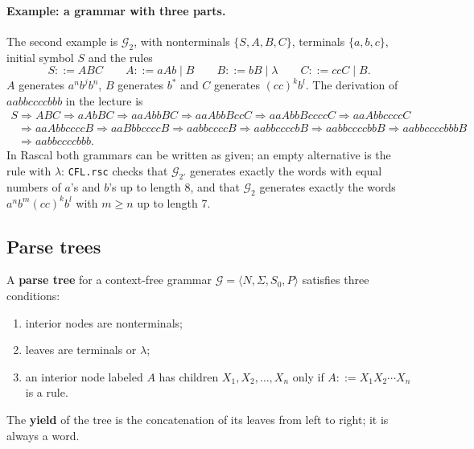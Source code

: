 \paragraph{Example: a grammar with three parts.} The second example is
$\mathcal{G}_2$, with nonterminals $\{S, A, B, C\}$, terminals $\{a, b, c\}$,
initial symbol $S$ and the rules
\[
S ::= ABC \qquad A ::= aAb \mid B \qquad B ::= bB \mid \lambda \qquad C ::= ccC \mid B.
\]
$A$ generates $a^n b^j b^n$, $B$ generates $b^*$ and $C$ generates $(cc)^k b^l$.
The derivation of $aabbccccbbb$ in the lecture is
\[
\begin{array}{l}
S \Rightarrow ABC \Rightarrow aAbBC \Rightarrow aaAbbBC \Rightarrow aaAbbBccC
  \Rightarrow aaAbbBccccC \Rightarrow aaAbbccccC \\
\phantom{S} \Rightarrow aaAbbccccB \Rightarrow aaBbbccccB \Rightarrow aabbccccB
  \Rightarrow aabbccccbB \Rightarrow aabbccccbbB \Rightarrow aabbccccbbbB \\
\phantom{S} \Rightarrow aabbccccbbb.
\end{array}
\]
In Rascal both grammars can be written as given; an empty alternative is the
rule with $\lambda$:
\texttt{CFL.rsc} checks that $\mathcal{G}_{2'}$ generates exactly the words with
equal numbers of $a$'s and $b$'s up to length 8, and that $\mathcal{G}_2$
generates exactly the words $a^n b^m (cc)^k b^l$ with $m \ge n$ up to length 7.

\subsection{Parse trees}

\begin{definition}
A \textbf{parse tree} for a context-free grammar $\mathcal{G} = \langle N, \Sigma,
S_0, P \rangle$ satisfies three conditions:
\begin{enumerate}
  \item interior nodes are nonterminals;
  \item leaves are terminals or $\lambda$;
  \item an interior node labeled $A$ has children $X_1, X_2, \dots, X_n$ only if
    $A ::= X_1 X_2 \cdots X_n$ is a rule.
\end{enumerate}
The \textbf{yield} of the tree is the concatenation of its leaves from left to
right; it is always a word.
\end{definition}

